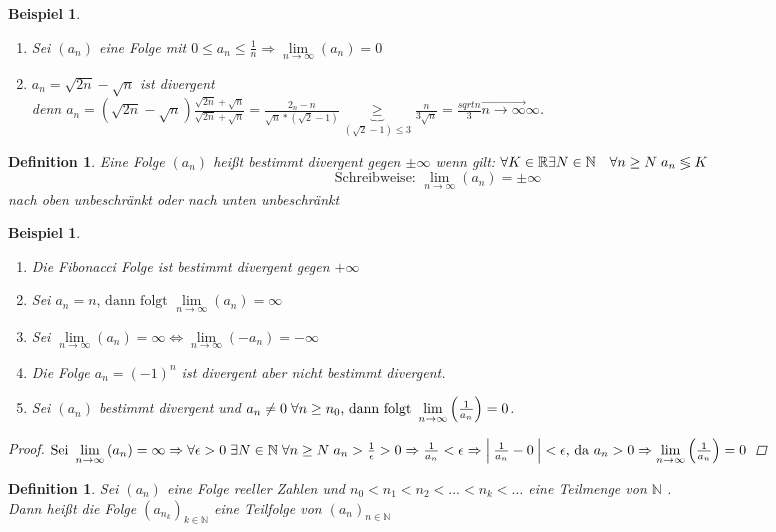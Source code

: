 \documentclass[a4paper,titlepage,oneside]{article}
\def\N{\ensuremath{\mathbb{N}} }
\def\R{\ensuremath{\mathbb{R}} }
\newcommand{\abs}[1]{\ensuremath{\left|\:#1\:\right|}}
\def\sp{\hspace{0,1cm}}
\renewcommand{\liminf}[2]{\ensuremath{\lim\limits_{#1 \rightarrow \infty}{\left(#2\right)}}}
\newcommand{\longtoinf}[1]{\overset{\longrightarrow}{#1 \to \infty}}
\theoremstyle{thmstyle}
\newtheorem{defi}[satz]{Definition}
\newtheorem{bsp}[satz]{Beispiel}
\begin{document}
\begin{bsp}
\begin{enumerate}
\item Sei \((a_n)\) eine Folge mit \(0 \le a_n \le \frac{1}{n} \Rightarrow \liminf{n}{a_n} = 0\)
\item \(a_n = \sqrt{2n} - \sqrt{n}\) ist divergent\\
denn \(a_n = \left(\sqrt{2n} - \sqrt{n}\right)\frac{\sqrt{2n} + \sqrt{n}}{\sqrt{2n} + \sqrt{n}} = \frac{2_n - n}{\sqrt{n}*\left(\sqrt{2} - 1\right)} \underbrace{\ge}_{\left(\sqrt{2} - 1\right)\le 3} \frac{n}{3\sqrt{n}} = \frac{sqrt{n}}{3} \longtoinf{n} \infty\).
\end{enumerate}
\end{bsp}

\begin{defi}
Eine Folge \((a_n)\) heißt bestimmt divergent gegen \(\pm \infty \) wenn gilt: \(\forall K \in \R \exists N \in \N \quad \forall n \ge N \sp a_n \lessgtr K \)
\[\text{Schreibweise: }\liminf{n}{a_n} = \pm \infty \]
nach oben unbeschränkt oder nach unten unbeschränkt
\end{defi}

\begin{bsp}
\begin{enumerate}
\item Die Fibonacci Folge ist bestimmt divergent gegen \(+ \infty\)
\item Sei \(a_n = n\text{, dann folgt }\liminf{n}{a_n} = \infty\)
\item Sei \(\liminf{n}{a_n} = \infty \Leftrightarrow \liminf{n}{-a_n} = - \infty\)
\item Die Folge \(a_n = (-1)^n\) ist divergent aber nicht bestimmt divergent.
\item Sei \((a_n)\) bestimmt divergent und \(a_n \ne 0 \sp \forall n \ge n_0\text{, dann folgt }\liminf{n}{\frac{1}{a_n}} = 0\).
\end{enumerate}
\begin{proof}
\(\text{Sei } \liminf{n}{a_n} = \infty \Rightarrow \forall \epsilon > 0 \sp \exists N \in \N \sp \forall n \ge N \sp a_n > \frac{1}{\epsilon} > 0 \Rightarrow \frac{1}{a_n} < \epsilon \Rightarrow \abs{\frac{1}{a_n} - 0} < \epsilon \text{, da } a_n > 0 \Rightarrow \liminf{n}{\frac{1}{a_n}} = 0\)
\end{proof}
\end{bsp}

\begin{defi}
Sei \((a_n)\) eine Folge reeller Zahlen und \(n_0 < n_1 < n_2 <... < n_k < \dots \) eine Teilmenge von \N.\\
Dann heißt die Folge \((a_{n_k})_{k \in \N }\) eine Teilfolge von \((a_n)_{n \in \N}\)
\end{defi}
\end{document}
